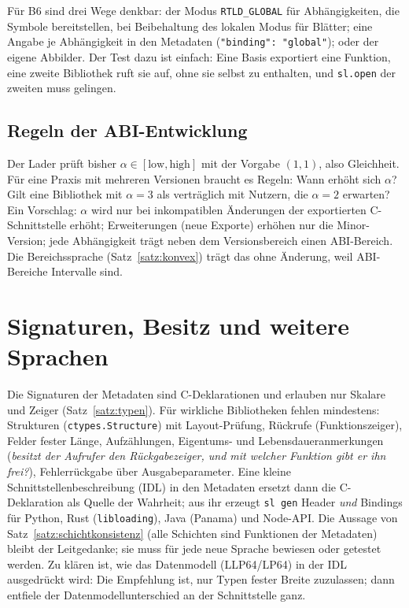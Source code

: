 Für B6 sind drei Wege denkbar: der Modus \texttt{RTLD\_GLOBAL} für Abhängigkeiten, die Symbole bereitstellen, bei Beibehaltung des lokalen Modus für Blätter; eine Angabe je Abhängigkeit in den Metadaten (\texttt{"binding": "global"}); oder der eigene Abbilder. Der Test dazu ist einfach: Eine Basis exportiert eine Funktion, eine zweite Bibliothek ruft sie auf, ohne sie selbst zu enthalten, und \texttt{sl.open} der zweiten muss gelingen.

\subsection{Regeln der ABI-Entwicklung}

Der Lader prüft bisher $\alpha\in[\mathrm{low},\mathrm{high}]$ mit der Vorgabe $(1,1)$, also Gleichheit. Für eine Praxis mit mehreren Versionen braucht es Regeln: Wann erhöht sich $\alpha$? Gilt eine Bibliothek mit $\alpha=3$ als verträglich mit Nutzern, die $\alpha=2$ erwarten? Ein Vorschlag: $\alpha$ wird nur bei inkompatiblen Änderungen der exportierten C-Schnittstelle erhöht; Erweiterungen (neue Exporte) erhöhen nur die Minor-Version; jede Abhängigkeit trägt neben dem Versionsbereich einen ABI-Bereich. Die Bereichssprache (Satz~\ref{satz:konvex}) trägt das ohne Änderung, weil ABI-Bereiche Intervalle sind.

\section{Signaturen, Besitz und weitere Sprachen}

Die Signaturen der Metadaten sind C-Deklarationen und erlauben nur Skalare und Zeiger (Satz~\ref{satz:typen}). Für wirkliche Bibliotheken fehlen mindestens: Strukturen (\texttt{ctypes.Structure}) mit Layout-Prüfung, Rückrufe (Funktionszeiger), Felder fester Länge, Aufzählungen, Eigentums- und Lebensdaueranmerkungen (\emph{besitzt der Aufrufer den Rückgabezeiger, und mit welcher Funktion gibt er ihn frei?}), Fehlerrückgabe über Ausgabeparameter. Eine kleine Schnittstellenbeschreibung (IDL) in den Metadaten ersetzt dann die C-Deklaration als Quelle der Wahrheit; aus ihr erzeugt \texttt{sl gen} Header \emph{und} Bindings für Python, Rust (\texttt{libloading}), Java (Panama) und Node-API. Die Aussage von Satz~\ref{satz:schichtkonsistenz} (alle Schichten sind Funktionen der Metadaten) bleibt der Leitgedanke; sie muss für jede neue Sprache bewiesen oder getestet werden. Zu klären ist, wie das Datenmodell (LLP64/LP64) in der IDL ausgedrückt wird: Die Empfehlung ist, nur Typen fester Breite zuzulassen; dann entfiele der Datenmodellunterschied an der Schnittstelle ganz.


